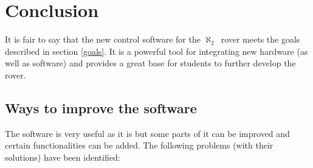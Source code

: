 \documentclass[english,inz,shortabstract]{iithesis}
\newcommand{\rovername}{$\aleph_2$\ }
\begin{document}
\chapter{Conclusion}
It is fair to say that the new control software for the \rovername rover meets the goals described in section \ref{goals}. It is a powerful tool for integrating new hardware (as well as software) and provides a great base for students to further develop the rover. 

\section{Ways to improve the software}
The software is very useful as it is but some parts of it can be improved and certain functionalities can be added. The following problems (with their solutions) have been identified: 
\end{document}
